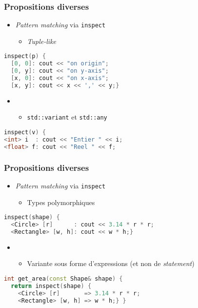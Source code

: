 \documentclass[C++.tex]{subfiles}
\begin{document}
\begin{frame}[fragile]
	\frametitle{Propositions diverses}
	\begin{itemize}
		\item \textit{Pattern matching} via \lstinline|inspect|
		\begin{itemize}
			\item \textit{Tuple-like}

		\end{itemize}
	\end{itemize}

	\begin{lstlisting}[language=C++]
inspect(p) {
  [0, 0]: cout << "on origin";
  [0, y]: cout << "on y-axis";
  [x, 0]: cout << "on x-axis";
  [x, y]: cout << x << ',' << y;}\end{lstlisting}

	\begin{itemize}
		\item [] \begin{itemize}
			\item \lstinline|std::variant| et \lstinline|std::any|
		\end{itemize}
	\end{itemize}

	\begin{lstlisting}[language=C++]
inspect(v) {
<int> i  : cout << "Entier " << i;
<float> f: cout << "Reel " << f;\end{lstlisting}
\end{frame}

\begin{frame}[fragile]
	\frametitle{Propositions diverses}
	\begin{itemize}
		\item \textit{Pattern matching} via \lstinline|inspect|
		\begin{itemize}
			\item Types polymorphiques
		\end{itemize}
	\end{itemize}

	\begin{lstlisting}[language=C++]
inspect(shape) {
  <Circle> [r]      : cout << 3.14 * r * r;
  <Rectangle> [w, h]: cout << w * h;}\end{lstlisting}

	\begin{itemize}
		\item [] \begin{itemize}
			\item Variante sous forme d'expressions (et non de \textit{statement})
		\end{itemize}
	\end{itemize}

	\begin{lstlisting}[language=C++]
int get_area(const Shape& shape) {
  return inspect(shape) {
    <Circle> [r]       => 3.14 * r * r;
    <Rectangle> [w, h] => w * h;} }\end{lstlisting}
\end{frame}
\end{document}
